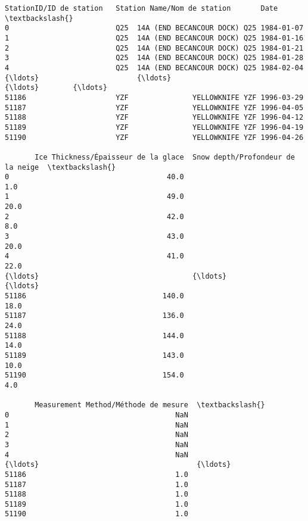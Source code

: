\documentclass[11pt]{article}
\makeatletter
\newcommand{\boxspacing}{\kern\kvtcb@left@rule\kern\kvtcb@boxsep}
\newcommand{\prompt}[4]{
        {\ttfamily\llap{{\color{#2}[#3]:\hspace{3pt}#4}}\vspace{-\baselineskip}}
    }
\makeatother
\begin{document}
            \begin{tcolorbox}[breakable, size=fbox, boxrule=.5pt, pad at break*=1mm, opacityfill=0]
\prompt{Out}{outcolor}{4}{\boxspacing}
\begin{Verbatim}[commandchars=\\\{\}]
      StationID/ID de station   Station Name/Nom de station       Date  \textbackslash{}
0                         Q25  14A (END BECANCOUR DOCK) Q25 1984-01-07
1                         Q25  14A (END BECANCOUR DOCK) Q25 1984-01-16
2                         Q25  14A (END BECANCOUR DOCK) Q25 1984-01-21
3                         Q25  14A (END BECANCOUR DOCK) Q25 1984-01-28
4                         Q25  14A (END BECANCOUR DOCK) Q25 1984-02-04
{\ldots}                       {\ldots}                           {\ldots}        {\ldots}
51186                     YZF               YELLOWKNIFE YZF 1996-03-29
51187                     YZF               YELLOWKNIFE YZF 1996-04-05
51188                     YZF               YELLOWKNIFE YZF 1996-04-12
51189                     YZF               YELLOWKNIFE YZF 1996-04-19
51190                     YZF               YELLOWKNIFE YZF 1996-04-26

       Ice Thickness/Épaisseur de la glace  Snow depth/Profondeur de la neige  \textbackslash{}
0                                     40.0                                1.0
1                                     49.0                               20.0
2                                     42.0                                8.0
3                                     43.0                               20.0
4                                     41.0                               22.0
{\ldots}                                    {\ldots}                                {\ldots}
51186                                140.0                               18.0
51187                                136.0                               24.0
51188                                144.0                               14.0
51189                                143.0                               10.0
51190                                154.0                                4.0

       Measurement Method/Méthode de mesure  \textbackslash{}
0                                       NaN
1                                       NaN
2                                       NaN
3                                       NaN
4                                       NaN
{\ldots}                                     {\ldots}
51186                                   1.0
51187                                   1.0
51188                                   1.0
51189                                   1.0
51190                                   1.0


\end{Verbatim}
\end{tcolorbox}
\end{document}
